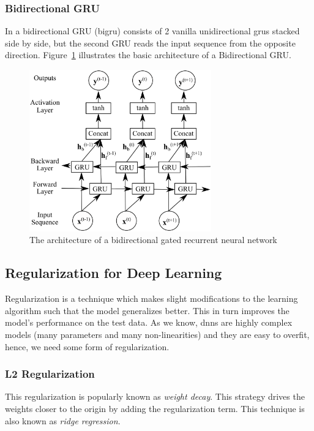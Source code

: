 \subsubsection{Bidirectional GRU}
In a  bidirectional GRU (\gls{bigru}) consists of 2 vanilla unidirectional \gls{gru}s stacked side by side, but the second GRU reads the input sequence from the opposite direction. Figure~\ref{fig:bidirectional_gru} illustrates the basic architecture of a Bidirectional GRU. 
\begin{figure}[t]
	\centering
	\includegraphics[width=0.7\textwidth]{figures/bigru.eps}
	\caption{The architecture of a bidirectional gated recurrent neural network \label{fig:bidirectional_gru}}
\end{figure}


\subsection{Regularization for Deep Learning}
Regularization is a technique which makes slight modifications to the learning algorithm such that the model generalizes better. This in turn improves the model's performance on the test data. As we know, \gls{dnn}s are highly complex models (many parameters and many non-linearities) and they are easy to overfit, hence, we need some form of regularization. 

\subsubsection{L2 Regularization}
This regularization is popularly known as \textit{weight decay}. This strategy drives the weights closer to the origin by adding the regularization term. This technique is also known as \textit{ridge regression}.

